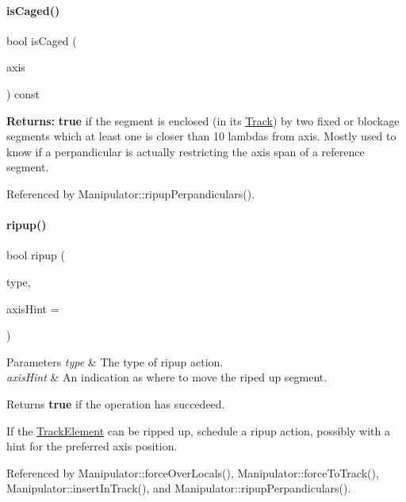 \paragraph{\texorpdfstring{is\+Caged()}{isCaged()}}
{\footnotesize\ttfamily bool is\+Caged (\begin{DoxyParamCaption}\item[{\textbf{ Db\+U\+::\+Unit}}]{axis }\end{DoxyParamCaption}) const}

{\bfseries Returns\+:} {\bfseries true} if the segment is enclosed (in it\textquotesingle{}s \mbox{\hyperlink{classKite_1_1Track}{Track}}) by two fixed or blockage segments which at least one is closer than 10 lambdas from {\ttfamily axis}. Mostly used to know if a perpandicular is actually restricting the axis span of a reference segment. 

Referenced by Manipulator\+::ripup\+Perpandiculars().

\mbox{\label{classKite_1_1Manipulator_a370b5a5373d3019510d4ec22f44c76c2}} 
\paragraph{\texorpdfstring{ripup()}{ripup()}}
{\footnotesize\ttfamily bool ripup (\begin{DoxyParamCaption}\item[{unsigned int}]{type,  }\item[{\textbf{ Db\+U\+::\+Unit}}]{axis\+Hint = {} }\end{DoxyParamCaption})}


\begin{DoxyParams}{Parameters}
{\em type} & The type of ripup action. \\
\hline
{\em axis\+Hint} & An indication as where to move the riped up segment. \\
\hline
\end{DoxyParams}
\begin{DoxyReturn}{Returns}
{\bfseries true} if the operation has succedeed.
\end{DoxyReturn}
If the \mbox{\hyperlink{classKite_1_1TrackElement}{Track\+Element}} can be ripped up, schedule a ripup action, possibly with a hint for the preferred axis position. 

Referenced by Manipulator\+::force\+Over\+Locals(), Manipulator\+::force\+To\+Track(), Manipulator\+::insert\+In\+Track(), and Manipulator\+::ripup\+Perpandiculars().


